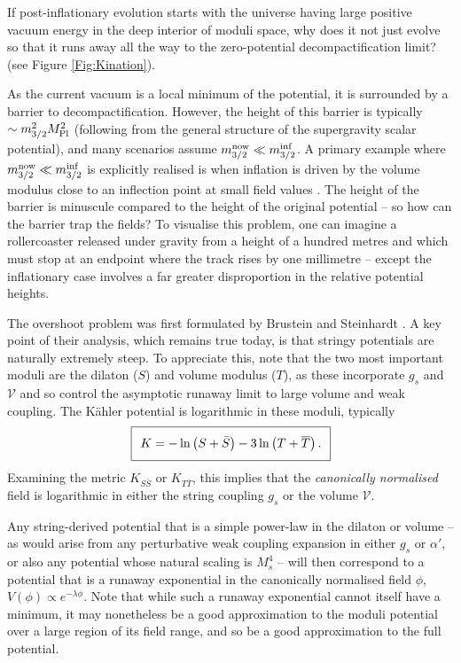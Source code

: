 If post-inflationary evolution starts with the universe having large positive vacuum energy in the deep interior of moduli space, why does it not just evolve so that it runs away all the way to the zero-potential decompactification limit? (see Figure \ref{Fig:Kination}).

As the current vacuum is a local minimum of the potential, it is surrounded by a barrier to decompactification. However, the height of this barrier is typically  $\sim m_{3/2}^2 M_{\rm Pl}^2$ (following from the general structure of the supergravity scalar potential), and many scenarios assume $m_{3/2}^{\rm now} \ll m_{3/2}^{\rm inf}$. A primary example where $m_{3/2}^{\rm now} \ll m_{3/2}^{\rm inf}$ is explicitly realised is when inflation is driven by the volume modulus close to an inflection point at small field values \cite{Conlon:2008cj, Cicoli:2015wja}. The height of the barrier is minuscule compared to the height of the original potential -- so how can the barrier trap the fields? To visualise this problem, one can imagine a rollercoaster released under gravity from a height of a hundred metres and which must stop at an endpoint where the track rises by one millimetre -- except the inflationary case involves a far greater disproportion in the relative potential heights.

The overshoot problem was first formulated by Brustein and Steinhardt \cite{Brustein:1992nk}. A key point of their analysis, which remains true today, is that stringy potentials are naturally extremely steep. To appreciate this, note that the two most important moduli are the dilaton ($S$) and volume modulus ($T$), as these incorporate $g_s$ and $\mathcal{V}$ and so control the asymptotic runaway limit to large volume and weak coupling. The K\"ahler potential is logarithmic in these moduli, typically
\begin{equation}
\setlength\fboxsep{0.25cm}
\setlength\fboxrule{0.4pt}
\boxed{
K = - \ln \left(S + \bar{S} \right) - 3 \ln \left( T + \overline{T} \right).
}
\end{equation}
Examining the metric $K_{S\bar{S}}$ or $K_{T\overline{T}}$, this implies that the \emph{canonically normalised} field is logarithmic in either the string coupling $g_s$ or the volume $\mathcal{V}$.

Any string-derived potential that is a simple power-law in the dilaton or volume -- as would arise from any perturbative weak coupling expansion in either $g_s$ or $\alpha'$, or also any potential whose natural scaling is $M_s^4$ -- will then correspond to a potential that is a runaway exponential in the canonically normalised field $\phi$, $V(\phi) \propto e^{-\lambda \phi}$. Note that while such a runaway exponential cannot itself have a minimum, it may nonetheless be a good approximation to the moduli potential over a large region of its field range, and so be a good approximation to the full potential.

